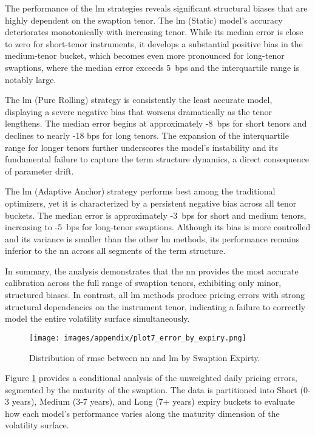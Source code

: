 The performance of the \ac{lm} strategies reveals significant structural biases that are highly dependent on the swaption tenor. The \ac{lm} (Static) model's accuracy deteriorates monotonically with increasing tenor. While its median error is close to zero for short-tenor instruments, it develops a substantial positive bias in the medium-tenor bucket, which becomes even more pronounced for long-tenor swaptions, where the median error exceeds 5~\ac{bps} and the interquartile range is notably large.

The \ac{lm} (Pure Rolling) strategy is consistently the least accurate model, displaying a severe negative bias that worsens dramatically as the tenor lengthens. The median error begins at approximately -8~\ac{bps} for short tenors and declines to nearly -18 \ac{bps} for long tenors. The expansion of the interquartile range for longer tenors further underscores the model's instability and its fundamental failure to capture the term structure dynamics, a direct consequence of parameter drift.

The \ac{lm} (Adaptive Anchor) strategy performs best among the traditional optimizers, yet it is characterized by a persistent negative bias across all tenor buckets. The median error is approximately -3~\ac{bps} for short and medium tenors, increasing to -5~\ac{bps} for long-tenor swaptions. Although its bias is more controlled and its variance is smaller than the other \ac{lm} methods, its performance remains inferior to the \ac{nn} across all segments of the term structure.

In summary, the analysis demonstrates that the \ac{nn} provides the most accurate calibration across the full range of swaption tenors, exhibiting only minor, structured biases. In contrast, all \ac{lm} methods produce pricing errors with strong structural dependencies on the instrument tenor, indicating a failure to correctly model the entire volatility surface simultaneously.

\begin{figure}[H]
	\centering
	\texttt{[image: images/appendix/plot7\_error\_by\_expiry.png]}
	\caption{Distribution of \ac{rmse} between \ac{nn} and \ac{lm} by Swaption Expirty.}
	\label{fig:distribution_rmse_by_swaption_expiriy}
\end{figure}

Figure \ref{fig:distribution_rmse_by_swaption_expiriy} provides a conditional analysis of the unweighted daily pricing errors, segmented by the maturity of the swaption. The data is partitioned into Short (0-3 years), Medium (3-7 years), and Long (7+ years) expiry buckets to evaluate how each model's performance varies along the maturity dimension of the volatility surface.

